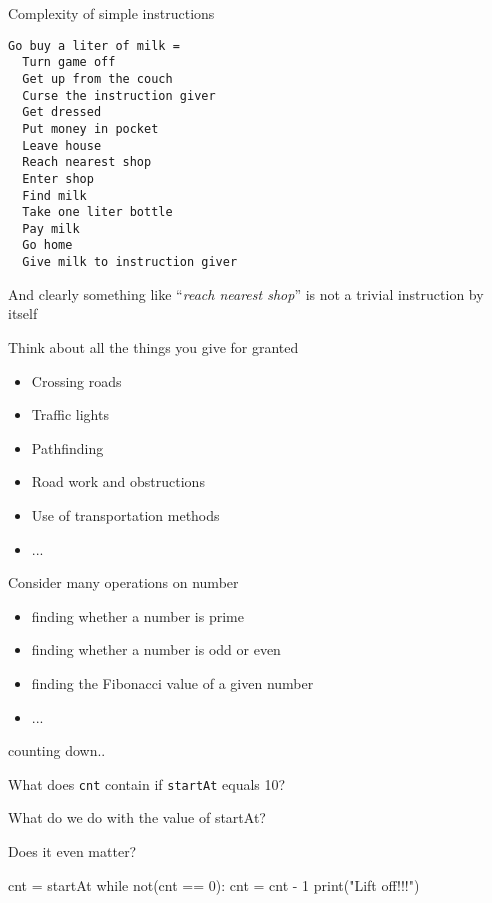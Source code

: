 \documentclass{beamer}
\begin{document}
\begin{frame}[fragile]{Complexity of simple instructions}
\begin{lstlisting}
Go buy a liter of milk =
  Turn game off
  Get up from the couch
  Curse the instruction giver
  Get dressed
  Put money in pocket
  Leave house
  Reach nearest shop
  Enter shop
  Find milk
  Take one liter bottle
  Pay milk
  Go home
  Give milk to instruction giver
\end{lstlisting}
\end{frame}

\begin{slide}{
\item And clearly something like ``\textit{reach nearest shop}'' is not a trivial instruction by itself
\item Think about all the things you give for granted
\begin{itemize}
\item Crossing roads
\item Traffic lights
\item Pathfinding
\item Road work and obstructions
\item Use of transportation methods
\item ...
\end{itemize}
}\end{slide}

\begin{slide}{
\item Consider many operations on number
\begin{itemize}
\item finding whether a number is prime
\item finding whether a number is odd or even
\item finding the Fibonacci value of a given number
\item ...
\end{itemize}
}\end{slide}

\begin{frame}[fragile]{counting down..}
\begin{codewithblock}{\pause \item What does \texttt{cnt} contain if \texttt{startAt} equals 10? \item What do we do with the value of startAt? \item Does it even matter?}
cnt = startAt
while not(cnt == 0):
  cnt = cnt - 1
print("Lift off!!!")
\end{codewithblock}
\end{frame}
\end{document}
